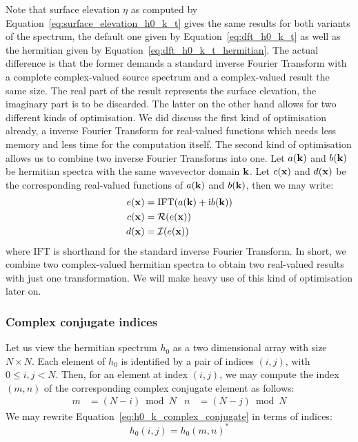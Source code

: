Note that surface elevation $\eta$ as computed by Equation~\ref{eq:surface_elevation_h0_k_t}
gives the same results for both variants of the spectrum, the default one given by
Equation~\ref{eq:dft_h0_k_t} as well as the hermitian given by Equation~\ref{eq:dft_h0_k_t_hermitian}.
The actual difference is that the former demands a standard inverse Fourier Transform with
a complete complex-valued source spectrum and a complex-valued result the same size. The real part
of the result represents the surface elevation, the imaginary part is to be discarded.
The latter on the other hand allows for two different kinds of optimisation. We did discuss
the first kind of optimisation already, a inverse Fourier Transform for real-valued
functions which needs less memory and less time for the computation itself. The second kind
of optimisation allows us to combine two inverse Fourier Transforms into one. Let $a(\mathbf{k})$
and $b(\mathbf{k})$ be hermitian spectra with the same wavevector domain $\mathbf{k}$. Let $c(\mathbf{x})$
and $d(\mathbf{x})$ be the corresponding real-valued functions of $a(\mathbf{k})$ and $b(\mathbf{k})$,
then we may write:
\begin{align}
\label{eq:idft_combined}
 e(\mathbf{x}) &= \mathrm{IFT}(a(\mathbf{k})+\mathrm{i}b(\mathbf{k})) \\
 c(\mathbf{x}) &= \mathcal{R}(e(\mathbf{x})) \\
 d(\mathbf{x}) &= \mathcal{I}(e(\mathbf{x})) 
\end{align}
where $\mathrm{IFT}$ is shorthand for the standard inverse Fourier Transform. In short, we combine
two complex-valued hermitian spectra to obtain two real-valued results with just one transformation.
We will make heavy use of this kind of optimisation later on.\\

\subsubsection{Complex conjugate indices}

Let us view the hermitian spectrum $h_0$ as a two dimensional array with size $N \times N$.
Each element of $h_0$ is identified by a pair of indices $(i,j)$, with $0\leq i,j <N$. Then, for
an element at index $(i,j)$, we may compute the index $(m,n)$ of the corresponding complex
conjugate element as follows:
\begin{align}
m &= (N - i)\bmod N & n &= (N - j)\bmod N
\end{align}
We may rewrite Equation~\ref{eq:h0_k_complex_conjugate} in terms of indices:
\begin{equation}
 h_0(i,j) = h_0(m,n)^*
\end{equation}

